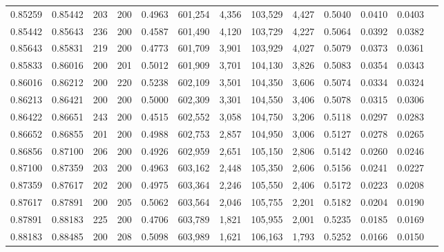 \begin{tabular}{rrrrrrrrrrrrr}
0.85259 & 0.85442 &   203 & 200 &                                     0.4963 & 601,254 &   4,356 & 103,529 &   4,427 & 0.5040 & 0.0410 & 0.0403 \\
0.85442 & 0.85643 &   236 & 200 &                                     0.4587 & 601,490 &   4,120 & 103,729 &   4,227 & 0.5064 & 0.0392 & 0.0382 \\
0.85643 & 0.85831 &   219 & 200 &                                     0.4773 & 601,709 &   3,901 & 103,929 &   4,027 & 0.5079 & 0.0373 & 0.0361 \\
0.85833 & 0.86016 &   200 & 201 &                                     0.5012 & 601,909 &   3,701 & 104,130 &   3,826 & 0.5083 & 0.0354 & 0.0343 \\
0.86016 & 0.86212 &   200 & 220 &                                     0.5238 & 602,109 &   3,501 & 104,350 &   3,606 & 0.5074 & 0.0334 & 0.0324 \\
0.86213 & 0.86421 &   200 & 200 &                                     0.5000 & 602,309 &   3,301 & 104,550 &   3,406 & 0.5078 & 0.0315 & 0.0306 \\
0.86422 & 0.86651 &   243 & 200 &                                     0.4515 & 602,552 &   3,058 & 104,750 &   3,206 & 0.5118 & 0.0297 & 0.0283 \\
0.86652 & 0.86855 &   201 & 200 &                                     0.4988 & 602,753 &   2,857 & 104,950 &   3,006 & 0.5127 & 0.0278 & 0.0265 \\
0.86856 & 0.87100 &   206 & 200 &                                     0.4926 & 602,959 &   2,651 & 105,150 &   2,806 & 0.5142 & 0.0260 & 0.0246 \\
0.87100 & 0.87359 &   203 & 200 &                                     0.4963 & 603,162 &   2,448 & 105,350 &   2,606 & 0.5156 & 0.0241 & 0.0227 \\
0.87359 & 0.87617 &   202 & 200 &                                     0.4975 & 603,364 &   2,246 & 105,550 &   2,406 & 0.5172 & 0.0223 & 0.0208 \\
0.87617 & 0.87891 &   200 & 205 &                                     0.5062 & 603,564 &   2,046 & 105,755 &   2,201 & 0.5182 & 0.0204 & 0.0190 \\
0.87891 & 0.88183 &   225 & 200 &                                     0.4706 & 603,789 &   1,821 & 105,955 &   2,001 & 0.5235 & 0.0185 & 0.0169 \\
0.88183 & 0.88485 &   200 & 208 &                                     0.5098 & 603,989 &   1,621 & 106,163 &   1,793 & 0.5252 & 0.0166 & 0.0150 \\

\end{tabular}
